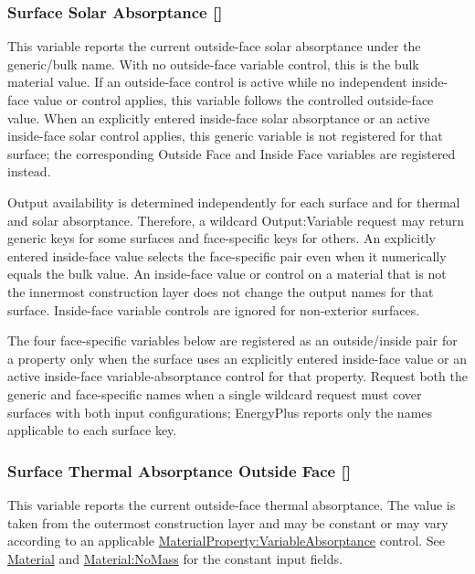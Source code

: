 \subsubsection{Surface Solar Absorptance {[}{]}}\label{surface-solar-absorptance}

This variable reports the current outside-face solar absorptance under the generic/bulk name. With no outside-face variable control, this is the bulk material value. If an outside-face control is active while no independent inside-face value or control applies, this variable follows the controlled outside-face value. When an explicitly entered inside-face solar absorptance or an active inside-face solar control applies, this generic variable is not registered for that surface; the corresponding Outside Face and Inside Face variables are registered instead.

Output availability is determined independently for each surface and for thermal and solar absorptance. Therefore, a wildcard Output:Variable request may return generic keys for some surfaces and face-specific keys for others. An explicitly entered inside-face value selects the face-specific pair even when it numerically equals the bulk value. An inside-face value or control on a material that is not the innermost construction layer does not change the output names for that surface. Inside-face variable controls are ignored for non-exterior surfaces.

The four face-specific variables below are registered as an outside/inside pair for a property only when the surface uses an explicitly entered inside-face value or an active inside-face variable-absorptance control for that property. Request both the generic and face-specific names when a single wildcard request must cover surfaces with both input configurations; EnergyPlus reports only the names applicable to each surface key.

\subsubsection{Surface Thermal Absorptance Outside Face {[}{]}}\label{surface-thermal-absorptance-outside-face}

This variable reports the current outside-face thermal absorptance. The value is taken from the outermost construction layer and may be constant or may vary according to an applicable \hyperref[materialpropertyvariableabsorptance]{MaterialProperty:VariableAbsorptance} control. See \hyperref[material]{Material} and \hyperref[materialnomass]{Material:NoMass} for the constant input fields.

